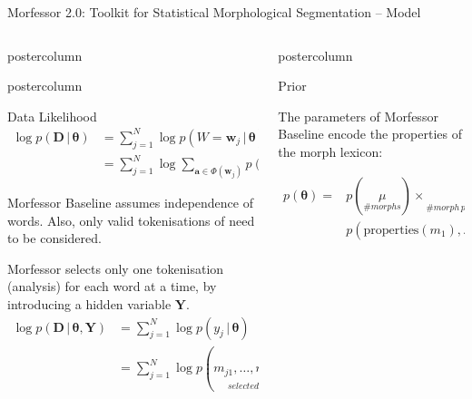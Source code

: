 \documentclass[final]{beamer} %
\newcommand{\mat}[1]{\mathbf{#1}}
\newcommand{\seq}[1]{\boldsymbol{#1}}
\newcommand{\txt}[1]{\textrm{#1}}
\newcommand{\len}[1]{\lvert#1\rvert}
\newcommand{\params}{\boldsymbol{\theta}}
\newcommand{\data}{\seq{D}}
\newcommand{\grammar}{\mathcal{G}}
\newcommand{\lexicon}{\mathcal{L}}
\newcommand{\tokenset}{\Phi}
\newcommand{\bound}{\#}
\newcommand{\vb}{\,|\,}
\newcommand{\Y}{\mat{Y}}
\begin{document}
\begin{frame}{Morfessor 2.0: Toolkit for Statistical Morphological Segmentation -- Model}
\begin{columns}
\begin{column}{.3\textwidth}
\begin{beamercolorbox}[center,wd=\textwidth]{postercolumn}
	\end{beamercolorbox}
\vspace{10mm}
      \begin{beamercolorbox}[center,wd=\textwidth]{postercolumn}
 \begin{block}{Data Likelihood}
\begin{align*}
  \log p(\data \vb \params)
  & = \sum_{j=1}^{N} \log p(W=\seq{w}_j \vb \params) \nonumber \\
  & = \sum_{j=1}^{N} \log \sum_{\seq{a} \in \tokenset(\seq{w}_j)}
  p(A=\seq{a} \vb \params),
\end{align*}

Morfessor Baseline assumes independence of words. Also, only valid tokenisations of need to be considered.

Morfessor selects only one tokenisation (analysis) for each word at a time, by introducing a hidden variable $\Y$. 
\begin{align*}
  \log p(\data \vb \params, \Y)
  & = \sum_{j=1}^{N} \log 
  p(y_j \vb \params) 
  \\&= \sum_{j=1}^{N} \log 
  p(\underset{selected\,analysis}{m_{j1}, \ldots, m_{j\len{\seq{y}_j}}, \bound_w} \vb \params) 
\label{eq:morphylikelihood}
\end{align*}

            \end{block}
	\end{beamercolorbox}




\end{column}

\begin{column}{.4\textwidth}


      \begin{beamercolorbox}[center,wd=\textwidth]{postercolumn}
 \begin{block}{Prior}

\citep{creutz07acm}
The parameters of Morfessor Baseline encode the properties of the morph lexicon:

\begin{align*}
p(\params)  =& p(\underset{\#morphs}{\mu}) \times \underset{\#morph\,permutations}{\mu!} \times\\& p(\txt{properties}(m_1), \ldots, \txt{properties}(m_{\mu}))  .
\end{align*}


\end{block}
\end{beamercolorbox}
\end{column}
\end{columns}
\end{frame}
\end{document}
